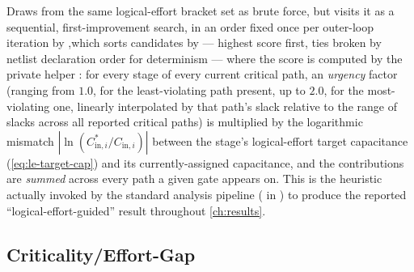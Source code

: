 Draws from the same logical-effort bracket set as brute force, but visits
it as a sequential, first-improvement search, in an order fixed once per
outer-loop iteration by ,\newline which sorts candidates by
 --- highest score first, ties broken by
netlist declaration order for determinism --- where the score is computed
by the private helper : for every stage of every current critical
path, an \emph{urgency} factor (ranging from $1.0$, for the
least-violating path present, up to $2.0$, for the most-violating one,
linearly interpolated by that path's slack relative to the range of
slacks across all reported critical paths) is multiplied by the
logarithmic mismatch $|\ln(C^{*}_{\mathrm{in},i} / C_{\mathrm{in},i})|$
between the stage's logical-effort target capacitance
(\cref{eq:le-target-cap}) and its currently-assigned capacitance, and the
contributions are \emph{summed} across every path a given gate appears on.
This is the heuristic actually invoked by the standard analysis pipeline
( in ) to produce
the reported ``logical-effort-guided'' result throughout \cref{ch:results}.

\subsection{Criticality/Effort-Gap}
\label{sec:opt-ceg}

